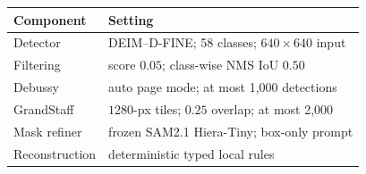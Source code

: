 \begin{center}
\begin{minipage}{\columnwidth}
\label{tab:implementation-settings}
\centering
\footnotesize
\setlength{\tabcolsep}{2.6pt}
\begin{tabular}{@{}ll@{}}
\toprule
Component & Setting \\
\midrule
Detector & DEIM--D-FINE; 58 classes; $640\!\times\!640$ input \\
Filtering & score $0.05$; class-wise NMS IoU $0.50$ \\
Debussy & auto page mode; at most 1,000 detections \\
GrandStaff & $1280$-px tiles; $0.25$ overlap; at most 2,000 \\
Mask refiner & frozen SAM2.1 Hiera-Tiny; box-only prompt \\
Reconstruction & deterministic typed local rules \\
\bottomrule
\end{tabular}
\end{minipage}
\end{center}
